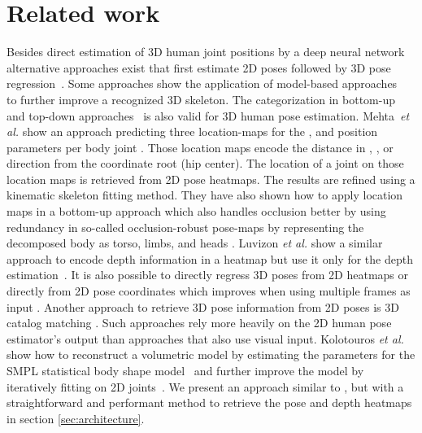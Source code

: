 \documentclass[a4paper, 10pt, conference]{ieeeconf}
\begin{document}
\section{Related work}
Besides direct estimation of 3D human joint positions by a deep neural network~\cite{mehtaVNectRealtime3D2017,mehtaSingleShotMultiperson3D2018,mehtaXNectRealtimeMultiperson2020,luvizonMultitaskDeepLearning2020} alternative approaches exist that first estimate 2D poses followed by 3D pose regression~\cite{chen3DHumanPose2017,pavllo3DHumanPose2019,tekinLearningFuse2D2017,zhou3DHumanPose2017,kolotourosLearningReconstruct3D2019}. Some approaches show the application of model-based approaches~\cite{bogoKeepItSMPL2016,zhouDeepKinematicPose2016,mehtaVNectRealtime3D2017,mehtaXNectRealtimeMultiperson2020,kolotourosLearningReconstruct3D2019} to further improve a recognized 3D skeleton. The categorization in bottom-up~\cite{mehtaSingleShotMultiperson3D2018} and top-down approaches~\cite{luvizon2D3DPose2018,mehtaVNectRealtime3D2017,mehtaXNectRealtimeMultiperson2020} is also valid for 3D human pose estimation. Mehta~\textit{et al.} show an approach predicting three location-maps for the ,  and  position parameters per body joint \cite{mehtaVNectRealtime3D2017}. Those location maps encode the distance in , , or  direction from the coordinate root (hip center). The location of a joint on those location maps is retrieved from 2D pose heatmaps. The results are refined using a kinematic skeleton fitting method. They have also shown how to apply location maps in a bottom-up approach which also handles occlusion better by using redundancy in so-called occlusion-robust pose-maps by representing the decomposed body as torso, limbs, and heads \cite{mehtaSingleShotMultiperson3D2018}. Luvizon \textit{et al.} show a similar approach to encode depth information in a heatmap but use it only for the depth estimation~\cite{luvizonMultitaskDeepLearning2020}. It is also possible to directly regress 3D poses from 2D heatmaps \cite{tekinLearningFuse2D2017} or directly from 2D pose coordinates \cite{martinezSimpleEffectiveBaseline2017} which improves when using multiple frames as input \cite{pavllo3DHumanPose2019}. Another approach to retrieve 3D pose information from 2D poses is 3D catalog matching \cite{chen3DHumanPose2017}. Such approaches rely more heavily on the 2D human pose estimator's output than approaches that also use visual input. Kolotouros \textit{et al.} show how to reconstruct a volumetric model by estimating the parameters for the SMPL statistical body shape model~\cite{loperSMPLSkinnedMultiperson2015} and further improve the model by iteratively fitting on 2D joints~\cite{kolotourosLearningReconstruct3D2019}. We present an approach similar to \cite{luvizonMultitaskDeepLearning2020}, but with a straightforward and performant method to retrieve the pose and depth heatmaps in section \ref{sec:architecture}.
\end{document}
